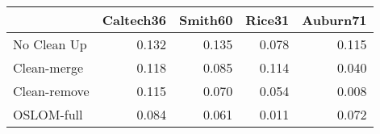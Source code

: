 \begin{tabular}{lrrrr}
\toprule
{} & Caltech36 & Smith60 & Rice31 & Auburn71 \\
\midrule
No Clean Up  &     0.132 &   0.135 &  0.078 &    0.115 \\
Clean-merge  &     0.118 &   0.085 &  0.114 &    0.040 \\
Clean-remove &     0.115 &   0.070 &  0.054 &    0.008 \\
OSLOM-full   &     0.084 &   0.061 &  0.011 &    0.072 \\
\bottomrule
\end{tabular}
